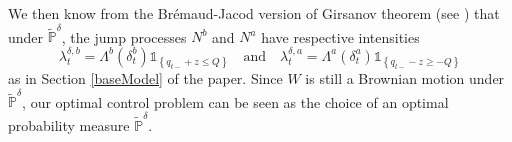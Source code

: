 \documentclass[preprint, 3p]{elsarticle}
\newcommand{\1}{{\chi}}
\begin{document}
\begin{appendix}
We then know from the Brémaud-Jacod version of Girsanov theorem (see \cite{bj}) that under $\tilde{\mathbb{P}}^\delta$, the jump processes $N^{b}$ and $N^{a}$ have respective intensities
$$\lambda^{\delta,b}_t  = \Lambda^b(\delta^b_t) \mathds{1}_{\left\{q_{t-} + z \le Q\right\}}  \quad \text{and} \quad \lambda^{\delta,a}_t  = \Lambda^a(\delta^a_t) \mathds{1}_{\left\{q_{t-} - z\ge -Q\right\}} $$ as in Section \ref{baseModel} of the paper. Since $W$ is still a Brownian motion under $\tilde{\mathbb{P}}^\delta$, our optimal control problem can be seen as the choice of an optimal probability measure $\tilde{\mathbb{P}}^\delta$.\\



\end{appendix}

\end{document}
